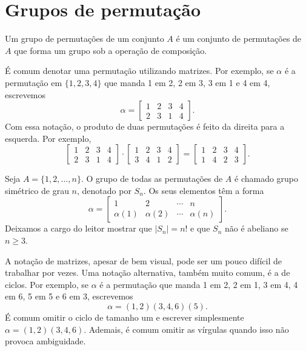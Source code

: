 \section{Grupos de permutação}
    \begin{definition}
    \label{def-grupo-perm}
        Um grupo de permutações de um conjunto $A$ é um conjunto de permutações de $A$ que forma
        um grupo sob a operação de composição.
    \end{definition}
    É comum denotar uma permutação utilizando matrizes. Por exemplo, se $\alpha$ é a permutação
    em $\{1, 2, 3, 4\}$ que manda 1 em 2, 2 em 3, 3 em 1 e 4 em 4, escrevemos
    \[
    \alpha = \begin{bmatrix}
        1 & 2 & 3 & 4 \\
        2 & 3 & 1 & 4
    \end{bmatrix}.
    \]
    Com essa notação, o produto de duas permutações é feito da direita para a esquerda. Por exemplo,
    \[
    \begin{bmatrix}
        1 & 2 & 3 & 4 \\
        2 & 3 & 1 & 4
    \end{bmatrix}\cdot
    \begin{bmatrix}
        1 & 2 & 3 & 4 \\
        3 & 4 & 1 & 2
    \end{bmatrix} =
    \begin{bmatrix}
        1 & 2 & 3 & 4 \\
        1 & 4 & 2 & 3
    \end{bmatrix}.
    \]
    \begin{example}
        Seja $A = \{1, 2, \dots, n\}$. O grupo de todas as permutações de $A$ é chamado
        grupo simétrico de grau $n$, denotado por $S_n$. Os seus elementos têm a forma
        \[
        \alpha = \begin{bmatrix}
            1 & 2 & \cdots & n \\
            \alpha(1) & \alpha(2) & \cdots & \alpha(n)
        \end{bmatrix}.
        \]
        Deixamos a cargo do leitor mostrar que $|S_n| = n!$ e que $S_n$ não é abeliano se $n\geq 3$.
    \end{example}
    A notação de matrizes, apesar de bem visual, pode ser um pouco difícil de trabalhar por vezes.
    Uma notação alternativa, também muito comum, é a de ciclos. Por exemplo, se $\alpha$ é a 
    permutação que manda 1 em 2, 2 em 1, 3 em 4, 4 em 6, 5 em 5 e 6 em 3, escrevemos
    \[
    \alpha = (1,2)(3,4,6)(5).
    \]
    É comum omitir o ciclo de tamanho um e escrever simplesmente $\alpha = (1,2)(3,4,6)$. 
    Ademais, é comum omitir as vírgulas quando isso não provoca ambiguidade.
    
